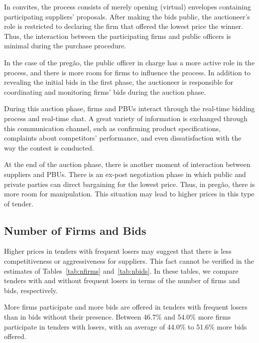 In convites, the process consists of merely opening (virtual) envelopes containing participating suppliers' proposals. After making the bids public, the auctioneer's role is restricted to declaring the firm that offered the lowest price the winner. Thus, the interaction between the participating firms and public officers is minimal during the purchase procedure.

In the case of the preg\~{a}o, the public officer in charge has a more active role in the process, and there is more room for firms to influence the process. In addition to revealing the initial bids in the first phase, the auctioneer is responsible for coordinating and monitoring firms' bids during the auction phase.

During this auction phase, firms and PBUs interact through the real-time bidding process and real-time chat. A great variety of information is exchanged through this communication channel, such as confirming product specifications, complaints about competitors' performance, and even dissatisfaction with the way the contest is conducted.

At the end of the auction phase, there is another moment of interaction between suppliers and PBUs. There is an ex-post negotiation phase in which public and private parties can direct bargaining for the lowest price. Thus, in preg\~{a}o, there is more room for manipulation. This situation may lead to higher prices in this type of tender.

\subsection{Number of Firms and Bids}

Higher prices in tenders with frequent losers may suggest that there is less competitiveness or aggressiveness for suppliers. This fact cannot be verified in the estimates of Tables~\ref{tab:nfirms} and~\ref{tab:nbids}. In these tables, we compare tenders with and without frequent losers in terms of the number of firms and bids, respectively.



More firms participate and more bids are offered in tenders with frequent losers than in bids without their presence. Between 46.7\% and 54.0\% more firms participate in tenders with losers, with an average of 44.0\% to 51.6\% more bids offered.



